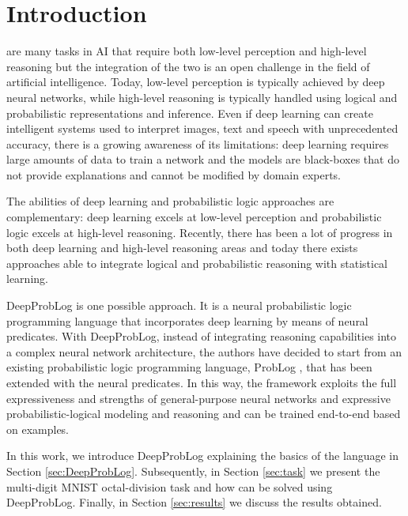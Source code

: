 \section{Introduction}
 are many tasks in AI that require both low-level perception and high-level reasoning but the integration of the two is an open challenge in the field of artificial intelligence. Today, low-level perception is typically achieved by deep neural networks, while high-level reasoning is typically handled using logical and probabilistic representations and inference. Even if deep learning can create intelligent systems used to interpret images, text and speech with unprecedented accuracy, there is a growing awareness of its limitations: deep learning requires large amounts of data to train a network and the models are black-boxes that do not provide explanations and cannot be modified by domain experts. 

The abilities of deep learning and probabilistic logic approaches are complementary: deep learning excels at low-level perception and probabilistic logic excels at high-level reasoning. Recently, there has been a lot of progress in both deep learning and high-level reasoning areas and today there exists approaches able to integrate logical and probabilistic reasoning with statistical learning.

DeepProbLog \cite{DeepProbLog} is one possible approach. It is a neural probabilistic logic programming language that incorporates deep learning by means of neural predicates. With DeepProbLog, instead of integrating reasoning capabilities into a complex neural network architecture, the authors have decided to start from an existing probabilistic logic programming language, ProbLog \cite{ProbLog}, that has been extended with the neural predicates. In this way, the framework exploits the full expressiveness and strengths of general-purpose neural networks and expressive probabilistic-logical modeling and reasoning and can be trained end-to-end based on examples.

In this work, we introduce DeepProbLog explaining the basics of the language in Section \ref{sec:DeepProbLog}. Subsequently, in Section \ref{sec:task} we present the multi-digit MNIST octal-division task and how can be solved using DeepProbLog. Finally, in Section \ref{sec:results} we discuss the results obtained.

